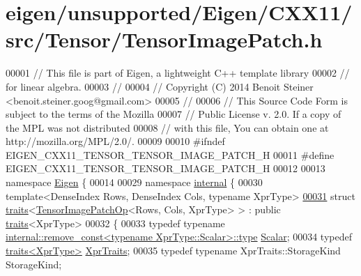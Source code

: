 \hypertarget{eigen_2unsupported_2_eigen_2_c_x_x11_2src_2_tensor_2_tensor_image_patch_8h_source}{}\section{eigen/unsupported/\+Eigen/\+C\+X\+X11/src/\+Tensor/\+Tensor\+Image\+Patch.h}
\label{eigen_2unsupported_2_eigen_2_c_x_x11_2src_2_tensor_2_tensor_image_patch_8h_source}

\begin{DoxyCode}
00001 \textcolor{comment}{// This file is part of Eigen, a lightweight C++ template library}
00002 \textcolor{comment}{// for linear algebra.}
00003 \textcolor{comment}{//}
00004 \textcolor{comment}{// Copyright (C) 2014 Benoit Steiner <benoit.steiner.goog@gmail.com>}
00005 \textcolor{comment}{//}
00006 \textcolor{comment}{// This Source Code Form is subject to the terms of the Mozilla}
00007 \textcolor{comment}{// Public License v. 2.0. If a copy of the MPL was not distributed}
00008 \textcolor{comment}{// with this file, You can obtain one at http://mozilla.org/MPL/2.0/.}
00009 
00010 \textcolor{preprocessor}{#ifndef EIGEN\_CXX11\_TENSOR\_TENSOR\_IMAGE\_PATCH\_H}
00011 \textcolor{preprocessor}{#define EIGEN\_CXX11\_TENSOR\_TENSOR\_IMAGE\_PATCH\_H}
00012 
00013 \textcolor{keyword}{namespace }\hyperlink{namespace_eigen}{Eigen} \{
00014 
00029 \textcolor{keyword}{namespace }\hyperlink{namespaceinternal}{internal} \{
00030 \textcolor{keyword}{template}<DenseIndex Rows, DenseIndex Cols, \textcolor{keyword}{typename} XprType>
\hyperlink{struct_eigen_1_1internal_1_1traits_3_01_tensor_image_patch_op_3_01_rows_00_01_cols_00_01_xpr_type_01_4_01_4}{00031} \textcolor{keyword}{struct }\hyperlink{struct_eigen_1_1internal_1_1traits}{traits}<\hyperlink{class_eigen_1_1_tensor_image_patch_op}{TensorImagePatchOp}<Rows, Cols, XprType> > : \textcolor{keyword}{public} 
      \hyperlink{struct_eigen_1_1internal_1_1traits}{traits}<XprType>
00032 \{
00033   \textcolor{keyword}{typedef} \textcolor{keyword}{typename} \hyperlink{group___sparse_core___module}{internal::remove\_const<typename XprType::Scalar>::type}
       \hyperlink{group___sparse_core___module}{Scalar};
00034   \textcolor{keyword}{typedef} \hyperlink{struct_eigen_1_1internal_1_1traits}{traits<XprType>} \hyperlink{struct_eigen_1_1internal_1_1traits}{XprTraits};
00035   \textcolor{keyword}{typedef} \textcolor{keyword}{typename} XprTraits::StorageKind StorageKind;

\end{DoxyCode}
